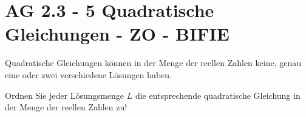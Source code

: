 \section{AG 2.3 - 5 Quadratische Gleichungen  - ZO - BIFIE}

\begin{beispiel}[AG 2.3]{1} %
	Quadratische Gleichungen können in der Menge der reellen Zahlen keine, genau eine oder zwei verschiedene Lösungen haben.
				
\leer

Ordnen Sie jeder Lösungsmenge $L$ die entsprechende quadratische Gleichung in der Menge der reellen Zahlen zu!

\end{beispiel}
